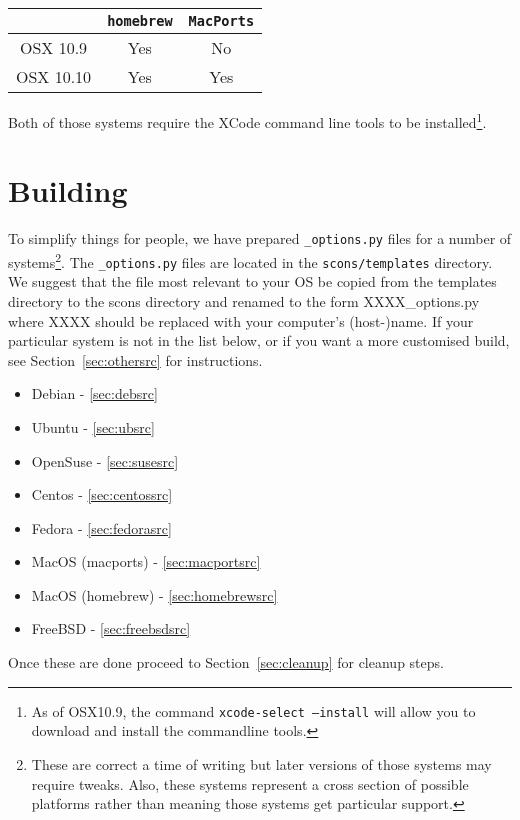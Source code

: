 \begin{center}
\begin{tabular}{|c|c|c|}\hline
 & \texttt{homebrew} & \texttt{MacPorts} \\\hline
OSX 10.9 & Yes & No\\\hline
OSX 10.10& Yes & Yes\\\hline
\end{tabular}
\end{center}

\noindent Both of those systems require the XCode command line tools to be installed\footnote{As of OSX10.9, the 
command \texttt{xcode-select --install} will allow you to download and install the commandline tools.}.

\section{Building}\label{sec:build}

To simplify things for people, we have prepared \texttt{_options.py} files for a number of 
systems\footnote{These are correct a time of writing but later versions of those systems may require tweaks. 
Also, these systems represent a cross section of possible platforms rather than meaning those systems get particular support.}.
The \texttt{_options.py} files are located in the \texttt{scons/templates} directory. We suggest that the file most relevant to your OS 
be copied from the templates directory to the scons directory and renamed to the form XXXX_options.py where XXXX 
should be replaced with your computer's (host-)name.
If your particular system is not in the list below, or if you want a more customised 
build, 
see Section~\ref{sec:othersrc} for instructions.
\begin{itemize}
 \item Debian - \ref{sec:debsrc}
 \item Ubuntu - \ref{sec:ubsrc}
 \item OpenSuse - \ref{sec:susesrc}
 \item Centos - \ref{sec:centossrc}
 \item Fedora - \ref{sec:fedorasrc}
 \item MacOS (macports) - \ref{sec:macportsrc}
 \item MacOS (homebrew) - \ref{sec:homebrewsrc}
 \item FreeBSD - \ref{sec:freebsdsrc}
\end{itemize}

Once these are done proceed to Section~\ref{sec:cleanup} for cleanup steps.

